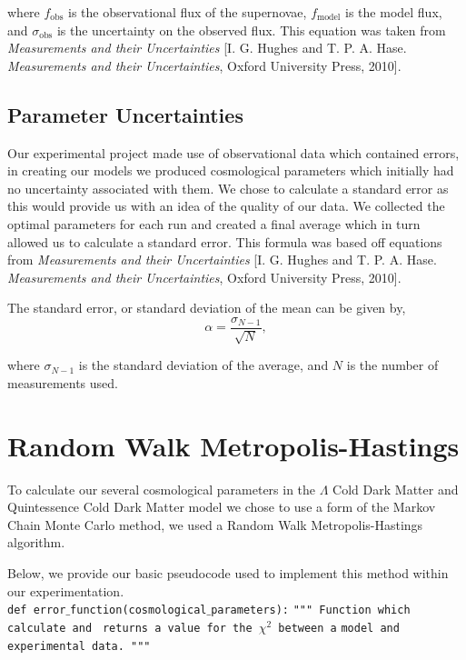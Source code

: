 \documentclass[twocolumn]{revtex4}
\begin{document}
{{{where $f_\text{obs}$ is the observational flux of the supernovae, $f_\text{model}$ is the model flux, and $\sigma_\text{obs}$ is the uncertainty on the observed flux. This equation was taken from \textit{Measurements and their Uncertainties} [I. G. Hughes and T. P. A. Hase. \textit{Measurements and their Uncertainties}, Oxford University Press, 2010].

\vspace{-3ex}
\subsection{Parameter Uncertainties}
\vspace{-2ex}
Our experimental project made use of observational data which contained errors, in creating our models we produced cosmological parameters which initially had no uncertainty associated with them. We chose to calculate a standard error as this would provide us with an idea of the quality of our data. We collected the optimal parameters for each run and created a final average which in turn allowed us to calculate a standard error. This formula was based off equations from \textit{Measurements and their Uncertainties} [I. G. Hughes and T. P. A. Hase. \textit{Measurements and their Uncertainties}, Oxford University Press, 2010].

The standard error, or standard deviation of the mean can be given by,
\begin{equation}
\alpha=\frac{\sigma_{N-1}}{\sqrt{N}},
\end{equation}

where $\sigma_{N-1}$ is the standard deviation of the average, and $N$ is the number of measurements used.
\clearpage

\vspace{-3ex}
\section{Random Walk Metropolis-Hastings}
\label{appendix:mcmc}
\vspace{-2ex}
To calculate our several cosmological parameters in the $\Lambda$ Cold Dark Matter and Quintessence Cold Dark Matter model we chose to use a form of the Markov Chain Monte Carlo method, we used a Random Walk Metropolis-Hastings algorithm. 

Below, we provide our basic pseudocode used to implement this method within our experimentation. \\

\texttt{def error$\_$function(cosmological$\_$parameters):}
\indent\indent\indent \texttt{""" Function which calculate and } 
\indent\indent\indent \texttt{returns a value for the $\chi^2$ between a}
\indent\indent\indent \texttt{model and experimental data. """} \\

}}}
\end{document}
